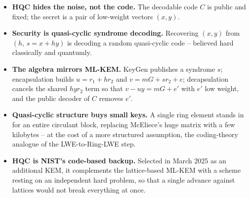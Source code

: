 \begin{itemize}
  \item \textbf{HQC hides the noise, not the code.} The decodable code $C$ is public and fixed; the secret is a pair of low-weight vectors $(x,y)$.
  \item \textbf{Security is quasi-cyclic syndrome decoding.} Recovering $(x,y)$ from $(h,\,s=x+hy)$ is decoding a random quasi-cyclic code -- believed hard classically and quantumly.
  \item \textbf{The algebra mirrors ML-KEM.} KeyGen publishes a syndrome $s$; encapsulation builds $u = r_1 + h r_2$ and $v = mG + s r_2 + e$; decapsulation cancels the shared $h y r_2$ term so that $v - u y = mG + e'$ with $e'$ low weight, and the public decoder of $C$ removes $e'$.
  \item \textbf{Quasi-cyclic structure buys small keys.} A single ring element stands in for an entire circulant block, replacing McEliece's huge matrix with a few kilobytes -- at the cost of a more structured assumption, the coding-theory analogue of the LWE-to-Ring-LWE step.
  \item \textbf{HQC is NIST's code-based backup.} Selected in March 2025 as an additional KEM, it complements the lattice-based ML-KEM with a scheme resting on an independent hard problem, so that a single advance against lattices would not break everything at once.
\end{itemize}

